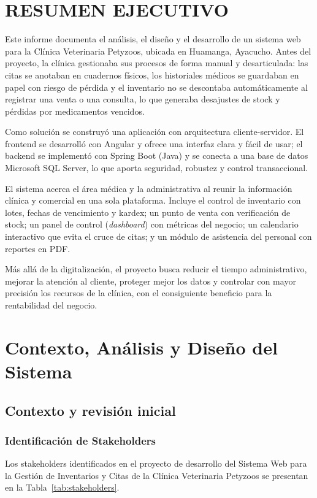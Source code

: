 \documentclass[11pt,a4paper]{report}
\begin{document}
\chapter*{RESUMEN EJECUTIVO}
Este informe documenta el análisis, el diseño y el desarrollo de un sistema web para la Clínica Veterinaria Petyzoos, ubicada en Huamanga, Ayacucho. Antes del proyecto, la clínica gestionaba sus procesos de forma manual y desarticulada: las citas se anotaban en cuadernos físicos, los historiales médicos se guardaban en papel con riesgo de pérdida y el inventario no se descontaba automáticamente al registrar una venta o una consulta, lo que generaba desajustes de stock y pérdidas por medicamentos vencidos.

Como solución se construyó una aplicación con arquitectura cliente-servidor. El frontend se desarrolló con Angular y ofrece una interfaz clara y fácil de usar; el backend se implementó con Spring Boot (Java) y se conecta a una base de datos Microsoft SQL Server, lo que aporta seguridad, robustez y control transaccional.

El sistema acerca el área médica y la administrativa al reunir la información clínica y comercial en una sola plataforma. Incluye el control de inventario con lotes, fechas de vencimiento y kardex; un punto de venta con verificación de stock; un panel de control (\textit{dashboard}) con métricas del negocio; un calendario interactivo que evita el cruce de citas; y un módulo de asistencia del personal con reportes en PDF.

Más allá de la digitalización, el proyecto busca reducir el tiempo administrativo, mejorar la atención al cliente, proteger mejor los datos y controlar con mayor precisión los recursos de la clínica, con el consiguiente beneficio para la rentabilidad del negocio.
\newpage

\chapter{Contexto, Análisis y Diseño del Sistema}

\section{Contexto y revisión inicial}
\subsection{Identificación de Stakeholders}
Los stakeholders identificados en el proyecto de desarrollo del Sistema Web para la Gestión de Inventarios y Citas de la Clínica Veterinaria Petyzoos se presentan en la Tabla~\ref{tab:stakeholders}.
\end{document}
